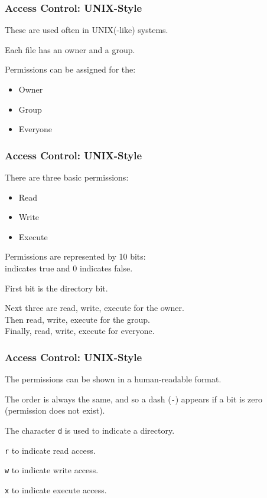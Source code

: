 \begin{frame}
	\frametitle{Access Control: UNIX-Style}

	These are used often in UNIX(-like) systems.

	Each file has an owner and a group.

	Permissions can be assigned for the:
	\begin{itemize}
		\item Owner
		\item Group
		\item Everyone
	\end{itemize}


\end{frame}

\begin{frame}
	\frametitle{Access Control: UNIX-Style}


	There are three basic permissions:

	\begin{itemize}
		\item Read
		\item Write
		\item Execute
	\end{itemize}

	Permissions are represented by 10 bits:\\
	 indicates true and 0 indicates false.

	First bit is the directory bit.

	Next three are read, write, execute for the owner.\\
	Then read, write, execute for the group.\\
	Finally, read, write, execute for everyone.


\end{frame}

\begin{frame}
	\frametitle{Access Control: UNIX-Style}


	The permissions can be shown in a human-readable format.

	The order is always the same, and so a dash (\texttt{-}) appears if a bit is zero (permission does not exist).

	The character \texttt{d} is used to indicate a directory.

	\texttt{r} to indicate read access.

	\texttt{w} to indicate write access.

	\texttt{x} to indicate execute access.



\end{frame}

